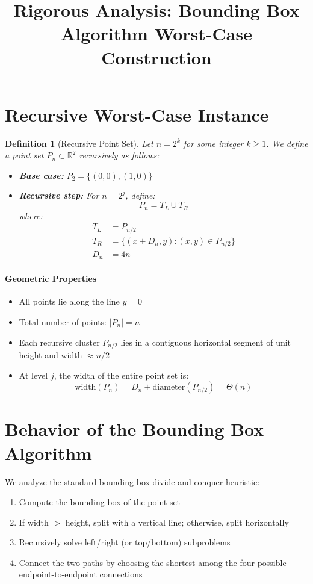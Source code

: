 \documentclass{article}
\title{Rigorous Analysis: Bounding Box Algorithm Worst-Case Construction}
\author{}
\date{}
\newtheorem{definition}{Definition}
\begin{document}
\maketitle

\section{Recursive Worst-Case Instance}

\begin{definition}[Recursive Point Set]
Let $n = 2^k$ for some integer $k \geq 1$. We define a point set $P_n \subset \mathbb{R}^2$ recursively as follows:
\begin{itemize}
    \item \textbf{Base case:} $P_2 = \{(0,0), (1,0)\}$
    \item \textbf{Recursive step:} For $n = 2^j$, define:
    \[
        P_n = T_L \cup T_R
    \]
    where:
    \begin{align*}
        T_L &= P_{n/2} \\
        T_R &= \{(x + D_n, y) : (x,y) \in P_{n/2} \} \\
        D_n &= 4n
    \end{align*}
\end{itemize}
\end{definition}

\paragraph{Geometric Properties}
\begin{itemize}
    \item All points lie along the line $y = 0$
    \item Total number of points: $|P_n| = n$
    \item Each recursive cluster $P_{n/2}$ lies in a contiguous horizontal segment of unit height and width $\approx n/2$
    \item At level $j$, the width of the entire point set is:
    \[
        \text{width}(P_n) = D_n + \text{diameter}(P_{n/2}) = \Theta(n)
    \]
\end{itemize}

\section{Behavior of the Bounding Box Algorithm}

We analyze the standard bounding box divide-and-conquer heuristic:
\begin{enumerate}
    \item Compute the bounding box of the point set
    \item If width $>$ height, split with a vertical line; otherwise, split horizontally
    \item Recursively solve left/right (or top/bottom) subproblems
    \item Connect the two paths by choosing the shortest among the four possible endpoint-to-endpoint connections
\end{enumerate}
\end{document}
